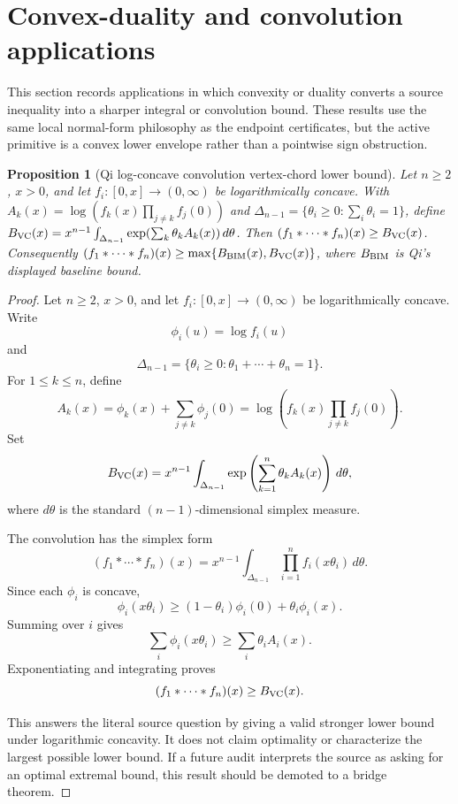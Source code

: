 \documentclass[11pt]{article}
\numberwithin{equation}{section}
\newtheorem{proposition}[theorem]{Proposition}
\theoremstyle{definition}
\theoremstyle{remark}
\newcommand{\1}{\mathbf 1}
\begin{document}
\section{Convex-duality and convolution applications}
\label{sec:convex-duality-and-convolution-applications}
This section records applications in which convexity or duality converts a source inequality into a sharper integral or convolution bound.  These results use the same local normal-form philosophy as the endpoint certificates, but the active primitive is a convex lower envelope rather than a pointwise sign obstruction.

\begin{proposition}[Qi log-concave convolution vertex-chord lower bound]
\label{res:qi-logconcaveconvolution-vertexchord-lowerbound}
Let \(n\ge2\), \(x>0\), and let \(f_i:[0,x]\to(0,\infty)\) be logarithmically concave. With \(A_k(x)=\log(f_k(x)\prod_{j\ne k}f_j(0))\) and \(\Delta_{n-1}=\{\theta_i\ge0:\sum_i\theta_i=1\}\), define \(B_{\rm VC}(x)=x^{n-1}\int_{\Delta_{n-1}}\exp(\sum_k\theta_kA_k(x))\,d\theta\). Then \((f_1*\cdots*f_n)(x)\ge B_{\rm VC}(x)\). Consequently \((f_1*\cdots*f_n)(x)\ge\max\{B_{\rm BIM}(x),B_{\rm VC}(x)\}\), where \(B_{\rm BIM}\) is Qi's displayed baseline bound.
\end{proposition}

\begin{proof}
Let \(n\ge2\), \(x>0\), and let \(f_i:[0,x]\to(0,\infty)\) be logarithmically concave. Write
\[
\phi_i(u)=\log f_i(u)
\]
and
\[
\Delta_{n-1}=\{\theta_i\ge0:\theta_1+\cdots+\theta_n=1\}.
\]
For \(1\le k\le n\), define
\[
A_k(x)=\phi_k(x)+\sum_{j\ne k}\phi_j(0)
=\log\left(f_k(x)\prod_{j\ne k}f_j(0)\right).
\]
Set
\[
B_{\rm VC}(x)=x^{n-1}\int_{\Delta_{n-1}}
\exp\left(\sum_{k=1}^n\theta_kA_k(x)\right)\,d\theta,
\]
where \(d\theta\) is the standard \((n-1)\)-dimensional simplex measure.

The convolution has the simplex form
\[
(f_1*\cdots*f_n)(x)
=x^{n-1}\int_{\Delta_{n-1}}\prod_{i=1}^n f_i(x\theta_i)\,d\theta.
\]
Since each \(\phi_i\) is concave,
\[
\phi_i(x\theta_i)\ge (1-\theta_i)\phi_i(0)+\theta_i\phi_i(x).
\]
Summing over \(i\) gives
\[
\sum_i\phi_i(x\theta_i)\ge\sum_i\theta_i A_i(x).
\]
Exponentiating and integrating proves
\[
(f_1*\cdots*f_n)(x)\ge B_{\rm VC}(x).
\]

This answers the literal source question by giving a valid stronger lower bound under logarithmic concavity. It does not claim optimality or characterize the largest possible lower bound. If a future audit interprets the source as asking for an optimal extremal bound, this result should be demoted to a bridge theorem.
\end{proof}
\end{document}
